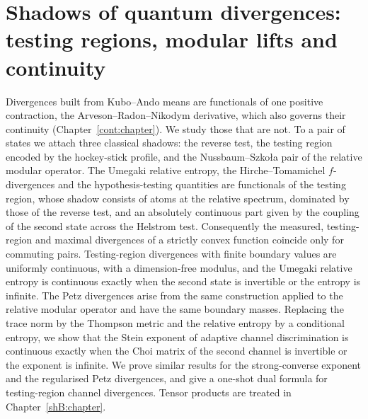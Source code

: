 \chapter{Shadows of quantum divergences: testing regions, modular lifts and continuity}\label{shA:chapter}
%
\begingroup
{}

\begin{chaptersummary}
Divergences built from Kubo--Ando means are functionals of one positive contraction, the Arveson--Radon--Nikodym derivative, which also governs their continuity (Chapter~\ref{cont:chapter}). We study those that are not. To a pair of states we attach three classical shadows: the reverse test, the testing region encoded by the hockey-stick profile, and the Nussbaum--Szko{\l}a pair of the relative modular operator. The Umegaki relative entropy, the Hirche--Tomamichel $f$-divergences and the hypothesis-testing quantities are functionals of the testing region, whose shadow consists of atoms at the relative spectrum, dominated by those of the reverse test, and an absolutely continuous part given by the coupling of the second state across the Helstrom test. Consequently the measured, testing-region and maximal divergences of a strictly convex function coincide only for commuting pairs. Testing-region divergences with finite boundary values are uniformly continuous, with a dimension-free modulus, and the Umegaki relative entropy is continuous exactly when the second state is invertible or the entropy is infinite. The Petz divergences arise from the same construction applied to the relative modular operator and have the same boundary masses. Replacing the trace norm by the Thompson metric and the relative entropy by a conditional entropy, we show that the Stein exponent of adaptive channel discrimination is continuous exactly when the Choi matrix of the second channel is invertible or the exponent is infinite. We prove similar results for the strong-converse exponent and the regularised Petz divergences, and give a one-shot dual formula for testing-region channel divergences. Tensor products are treated in Chapter~\ref{shB:chapter}.
\end{chaptersummary}

